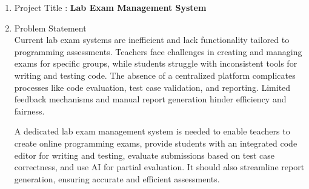 \documentclass[14pt]{article}
\begin{document}
\begin{enumerate}
\item Project Title : \textbf{Lab Exam Management System}
\item Problem Statement \\
\tabto{.5cm}Current lab exam systems are inefficient and lack functionality tailored to programming assessments. Teachers face challenges in creating and managing exams for specific groups, while students struggle with inconsistent tools for writing and testing code.
The absence of a centralized platform complicates processes like code evaluation, test case validation, and reporting. Limited feedback mechanisms and manual report generation hinder efficiency and fairness.

A dedicated lab exam management system is needed to enable teachers to create online programming exams, provide students with an integrated code editor for writing and testing, evaluate submissions based on test case correctness, and use AI for partial evaluation. It should also streamline report generation, ensuring accurate and efficient assessments.\\


\end{enumerate}
\end{document}

